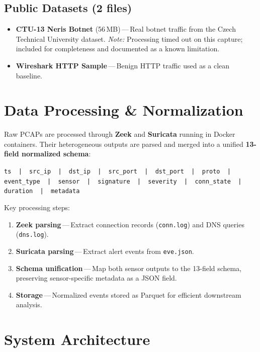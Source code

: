 \documentclass[11pt, a4paper]{article}
\begin{document}
\subsection{Public Datasets (2 files)}
\begin{itemize}[itemsep=2pt]
    \item \textbf{CTU-13 Neris Botnet} (56\,MB)\,---\,Real botnet traffic from the Czech Technical University dataset. \textit{Note:} Processing timed out on this capture; included for completeness and documented as a known limitation.
    \item \textbf{Wireshark HTTP Sample}\,---\,Benign HTTP traffic used as a clean baseline.
\end{itemize}

\section{Data Processing \& Normalization}

Raw PCAPs are processed through \textbf{Zeek} and \textbf{Suricata} running in Docker containers. Their heterogeneous outputs are parsed and merged into a unified \textbf{13-field normalized schema}:

\begin{center}\small
\texttt{ts \,|\, src\_ip \,|\, dst\_ip \,|\, src\_port \,|\, dst\_port \,|\, proto \,|\, event\_type \,|\, sensor \,|\, signature \,|\, severity \,|\, conn\_state \,|\, duration \,|\, metadata}
\end{center}

\noindent Key processing steps:
\begin{enumerate}[itemsep=2pt]
    \item \textbf{Zeek parsing}\,---\,Extract connection records (\texttt{conn.log}) and DNS queries (\texttt{dns.log}).
    \item \textbf{Suricata parsing}\,---\,Extract alert events from \texttt{eve.json}.
    \item \textbf{Schema unification}\,---\,Map both sensor outputs to the 13-field schema, preserving sensor-specific metadata as a JSON field.
    \item \textbf{Storage}\,---\,Normalized events stored as Parquet for efficient downstream analysis.
\end{enumerate}

\section{System Architecture}
\end{document}
